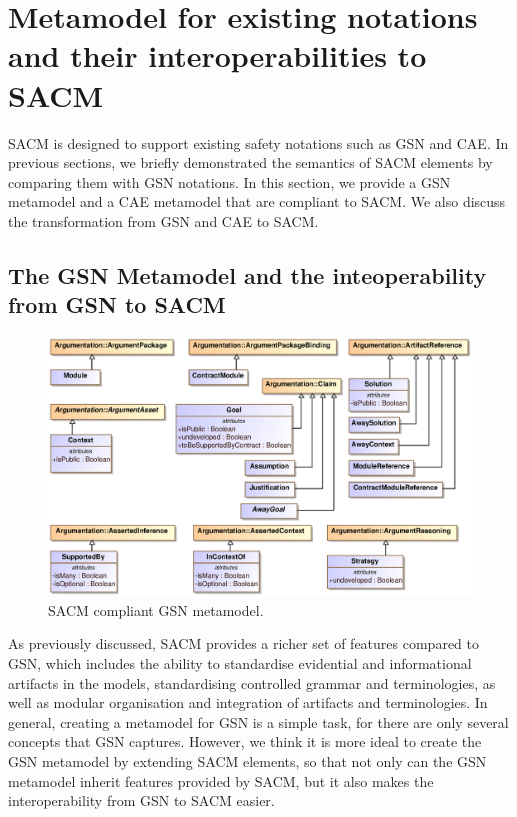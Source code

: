 \section{Metamodel for  existing notations and their interoperabilities to SACM}
\label{sec:mapping}
SACM is designed to support existing safety notations such as GSN and CAE. 
In previous sections, we briefly demonstrated the semantics of SACM elements by comparing them with GSN notations. 
In this section, we provide a GSN metamodel and a CAE metamodel that are compliant to SACM. 
We also discuss the transformation from GSN and CAE to SACM.

\subsection{The GSN Metamodel and the inteoperability from GSN to SACM}
\begin{figure}
	\centering
	\includegraphics[width=1\linewidth]{GSN.eps}
	\caption{SACM compliant GSN metamodel.}
	\label{fig:gsnMetamodel}
\end{figure}

As previously discussed, SACM provides a richer set of features compared to GSN, which includes the ability to standardise evidential and informational artifacts in the models, standardising controlled grammar and terminologies, as well as modular organisation and integration of artifacts and terminologies. 
In general, creating a metamodel for GSN is a simple task, for there are only several concepts that GSN captures. 
However, we think it is more ideal to create the GSN metamodel by extending SACM elements, so that not only can the GSN metamodel inherit features provided by SACM, but it also makes the interoperability from GSN to SACM easier. 

